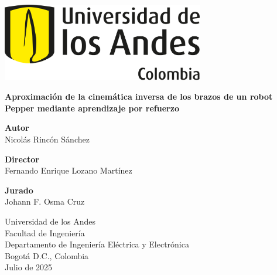 \documentclass[spanish,10pt,letterpaper,onecolumn]{article}
\begin{document}
	
	\begin{titlepage}
		\centering
		\vspace*{2cm}
		
		\includegraphics[width=250pt]{images/logo-uniandes.png}\par\vspace{2cm}
		
		{\Huge\bfseries Aproximación de la cinemática inversa de los brazos de un robot Pepper mediante aprendizaje por refuerzo\par}
		\vspace{2cm}
		
		{\Large \textbf{Autor}\\ Nicolás Rincón Sánchez\par}
		\vspace{0.5cm}
		{\Large \textbf{Director}\\ Fernando Enrique Lozano Martínez\par}
		\vspace{0.5cm}
		{\Large \textbf{Jurado}\\ Johann F. Osma Cruz\par}
		
		\vfill
		
		{\Large
			Universidad de los Andes\\
			Facultad de Ingeniería\\
			Departamento de Ingeniería Eléctrica y Electrónica\\
			Bogotá D.C., Colombia\\
			Julio de 2025
		}
	\end{titlepage}

	\newpage
	\thispagestyle{empty}
	
	
	\newpage
	\setcounter{page}{1} 
	
	\renewcommand{\contentsname}{Tabla de contenido}
	\tableofcontents
	\newpage
	
	
	
	
	
	
	
	
	
	
	
	
	
	
	
	
	
	\newpage
	\printbibliography
	
\end{document}
